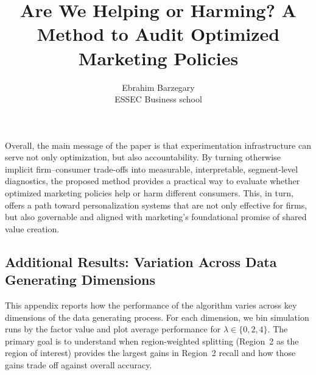 \documentclass[11pt,letterpaper,english]{article}
\theoremstyle{definition}
\theoremstyle{definition}
\begin{document}
\begin{bibunit}
Overall, the main message of the paper is that experimentation infrastructure can serve not only optimization, but also accountability. By turning otherwise implicit firm--consumer trade-offs into measurable, interpretable, segment-level diagnostics, the proposed method provides a practical way to evaluate whether optimized marketing policies help or harm different consumers. This, in turn, offers a path toward personalization systems that are not only effective for firms, but also governable and aligned with marketing’s foundational promise of shared value creation.



\newpage
\renewcommand{\baselinestretch}{1.0} 
\putbib


\end{bibunit}
\begin{bibunit}

\newpage

\setcounter{table}{0}
\setcounter{page}{1}
\setcounter{figure}{0}
\setcounter{equation}{0}
\setcounter{footnote}{0}
\renewcommand{\thetable}{A\arabic{table}}
\renewcommand{\thefigure}{A\arabic{figure}}
\renewcommand{\theequation}{A.\arabic{equation}}
\renewcommand{\thepage}{\roman{page}}
\title{Are We Helping or Harming? A Method to Audit Optimized Marketing Policies}


\author{
       Ebrahim Barzegary  \\
        ESSEC Business school\\
 }

\maketitle
\begin{appendices}

\section{Additional Results: Variation Across Data Generating Dimensions}
\label{app:lambda-dimensions}

This appendix reports how the performance of the algorithm varies across key dimensions of the data generating process. For each dimension, we bin simulation runs by the factor value and plot average performance for $\lambda\in\{0,2,4\}$. The primary goal is to understand when region-weighted splitting (Region~2 as the region of interest) provides the largest gains in Region~2 recall and how those gains trade off against overall accuracy.


\end{appendices}
\end{bibunit}
\end{document}
